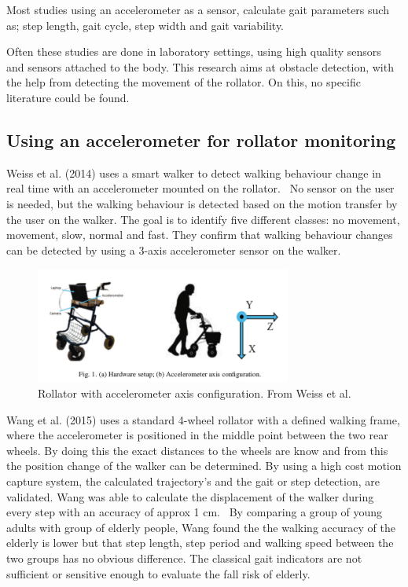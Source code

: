 Most studies using an accelerometer as a sensor, calculate gait parameters such as; step length, gait cycle, step width and gait variability.~\cite{Wang2015} 

Often these studies are done in laboratory settings, using high quality sensors and sensors attached to the body.
This research aims at obstacle detection, with the help from detecting the movement of the rollator. On this, no specific literature could be found.

\subsection{Using an accelerometer for rollator monitoring}

Weiss et al. (2014) uses a smart walker to detect walking behaviour change in real time with an accelerometer mounted on the rollator.~\cite{Weiss2014} No sensor on the user is needed, but the walking behaviour is detected based on the motion transfer by the user on the walker. The goal is to identify five different classes: no movement, movement, slow, normal and fast. They confirm that walking behaviour changes can be detected by using a 3-axis accelerometer sensor on the walker.


\begin{figure}[h]
\includegraphics[width=0.75\textwidth]{img/B_Weiss.png}
\centering
\caption[Rollator with accelerometer axis configuration]{Rollator with accelerometer axis configuration. From Weiss et al.~\cite{Weiss2014} \label{rolaxis}}
\end{figure}

Wang et al. (2015) uses a standard 4-wheel rollator with a defined walking frame, where the accelerometer is positioned in the middle point between the two rear wheels. By doing this the exact distances to the wheels are know and from this the position change of the walker can be determined. By using a high cost motion capture system, the calculated trajectory's and the gait or step detection, are validated. Wang was able to calculate the displacement of the walker during every step with an accuracy of approx 1 cm.~\cite{Wang2015} By comparing a group of young adults with group of elderly people, Wang found the the walking accuracy of the elderly is lower but that step length, step period and walking speed between the two groups has no obvious difference. The classical gait indicators are not sufficient or sensitive enough to evaluate the fall risk of elderly.~\cite{Wang2015}
 
